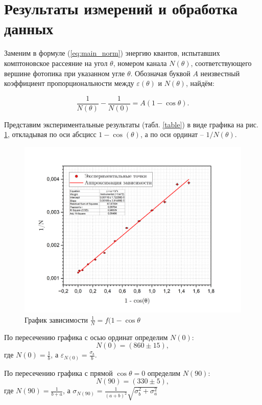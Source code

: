 \documentclass[a4paper, 12pt]{article}
\begin{document}
    \newpage
	
    \section{Результаты измерений и обработка данных}

    Заменим в формуле (\ref{eq:main_norm}) энергию квантов, испытавших комптоновское рассеяние на угол $\theta$, номером канала $N(\theta)$, соответствующего вершине фотопика при указанном угле $\theta$. Обозначая буквой $A$ неизвестный коэффициент пропорциональности между $\varepsilon(\theta)$ и $N(\theta)$, найдём:
    
	\begin{equation}
        \label{eq:main_final}
		\dfrac{1}{N(\theta)} - \dfrac{1}{N(0)} = A (1- \cos{\theta}).
	\end{equation}
 
	Представим экспериментальные результаты (табл. \ref{table}) в виде графика на рис. \ref{graph}, откладывая по оси абсцисс $1-\cos(\theta) $, а по оси ординат -- $ {1}/{N(\theta)} $.
	\begin{figure}[H]
		\centering
		\includegraphics[width = 14 cm]{images/graph.png}
		\caption{График зависимости $\frac{1}{N} = f(1-\cos{\theta}$}
		\label{graph}
	\end{figure}
 
	По пересечению графика с осью ординат определим $N(0)$:
	$$N(0) = \left( 860 \pm 15 \right),$$ 
    где $N(0) = \frac{1}{b}$, а $\varepsilon_{N(0)} = \frac{\sigma_b}{b}$.
	
	По пересечению графика с прямой $\cos \theta = 0$ определим $N(90)$:
	$$N(90) = \left( 330 \pm 5 \right),$$
	где $N(90) = \frac{1}{b + a}$, а $\sigma_{N(90)} = \frac{1}{(a + b)^2}\sqrt{\sigma_b^2 + \sigma_a^2}$
	
\end{document}
